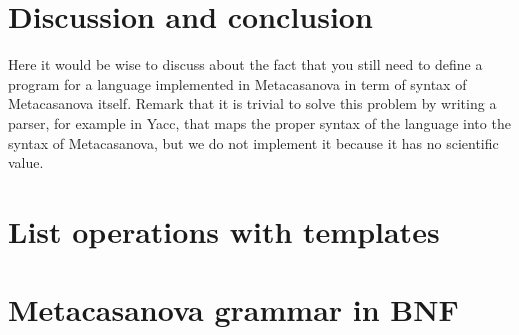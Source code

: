 \documentclass[8pt,a5paper,openright]{extbook}
\theoremstyle{definition}
\begin{document}
\chapter{Discussion and conclusion}
\label{ch:discussion}
Here it would be wise to discuss about the fact that you still need to define a program for a language implemented in Metacasanova in term of syntax of Metacasanova itself. Remark that it is trivial to solve this problem by writing a parser, for example in Yacc, that maps the proper syntax of the language into the syntax of Metacasanova, but we do not implement it because it has no scientific value.

\appendix
\chapter{List operations with templates}
\label{app:template}


\chapter{Metacasanova grammar in BNF}
\label{app:metacasanova_grammar}

\backmatter



\end{document}

